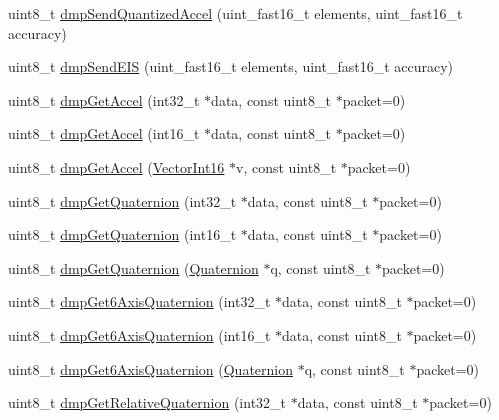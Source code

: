 \begin{DoxyCompactItemize}
\item 
uint8\+\_\+t \mbox{\hyperlink{classMPU6050_a7383c4681b040cefc31d472362b7aeb2}{dmp\+Send\+Quantized\+Accel}} (uint\+\_\+fast16\+\_\+t elements, uint\+\_\+fast16\+\_\+t accuracy)
\item 
uint8\+\_\+t \mbox{\hyperlink{classMPU6050_a628d208cf85fcf46b3e100880e332e19}{dmp\+Send\+E\+IS}} (uint\+\_\+fast16\+\_\+t elements, uint\+\_\+fast16\+\_\+t accuracy)
\item 
uint8\+\_\+t \mbox{\hyperlink{classMPU6050_a113be793514449548008fe1eae5459ef}{dmp\+Get\+Accel}} (int32\+\_\+t $\ast$data, const uint8\+\_\+t $\ast$packet=0)
\item 
uint8\+\_\+t \mbox{\hyperlink{classMPU6050_a7fdca0e0bf7d8a20818c28d4ed734647}{dmp\+Get\+Accel}} (int16\+\_\+t $\ast$data, const uint8\+\_\+t $\ast$packet=0)
\item 
uint8\+\_\+t \mbox{\hyperlink{classMPU6050_a31018c8a11a8a87725faab59bb948da7}{dmp\+Get\+Accel}} (\mbox{\hyperlink{classVectorInt16}{Vector\+Int16}} $\ast$v, const uint8\+\_\+t $\ast$packet=0)
\item 
uint8\+\_\+t \mbox{\hyperlink{classMPU6050_aac2d2a0de3fd26e37b8341206fc26260}{dmp\+Get\+Quaternion}} (int32\+\_\+t $\ast$data, const uint8\+\_\+t $\ast$packet=0)
\item 
uint8\+\_\+t \mbox{\hyperlink{classMPU6050_a96eacd8075f484bad2376c95b0defb26}{dmp\+Get\+Quaternion}} (int16\+\_\+t $\ast$data, const uint8\+\_\+t $\ast$packet=0)
\item 
uint8\+\_\+t \mbox{\hyperlink{classMPU6050_a712866736969fb002303c55effc627cb}{dmp\+Get\+Quaternion}} (\mbox{\hyperlink{classQuaternion}{Quaternion}} $\ast$q, const uint8\+\_\+t $\ast$packet=0)
\item 
uint8\+\_\+t \mbox{\hyperlink{classMPU6050_a776c9ba67375bfe59432e7f78c7eab87}{dmp\+Get6\+Axis\+Quaternion}} (int32\+\_\+t $\ast$data, const uint8\+\_\+t $\ast$packet=0)
\item 
uint8\+\_\+t \mbox{\hyperlink{classMPU6050_a9c074fce94329c3f41aa6cddc2080358}{dmp\+Get6\+Axis\+Quaternion}} (int16\+\_\+t $\ast$data, const uint8\+\_\+t $\ast$packet=0)
\item 
uint8\+\_\+t \mbox{\hyperlink{classMPU6050_a2fff9f9904645926472a7527b20d2330}{dmp\+Get6\+Axis\+Quaternion}} (\mbox{\hyperlink{classQuaternion}{Quaternion}} $\ast$q, const uint8\+\_\+t $\ast$packet=0)
\item 
uint8\+\_\+t \mbox{\hyperlink{classMPU6050_a355a874853887baea2e8152a218a1358}{dmp\+Get\+Relative\+Quaternion}} (int32\+\_\+t $\ast$data, const uint8\+\_\+t $\ast$packet=0)

\end{DoxyCompactItemize}
